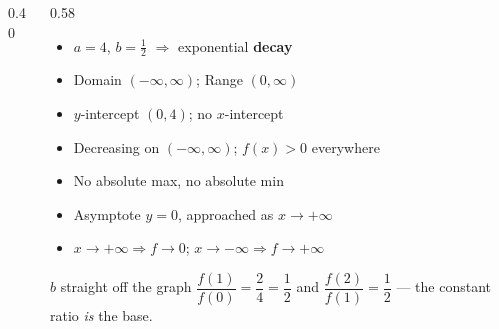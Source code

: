\documentclass[aspectratio=169, 11pt]{beamer}
\newcommand{\lgrid}[4]{%
  \draw[step=1, linegray!45, thin] (#1,#3) grid (#2,#4);
  \draw[->, thick, charcoal] (#1,0)--(#2,0) node[below right, font=\tiny]{$x$};
  \draw[->, thick, charcoal] (0,#3)--(0,#4) node[left, font=\tiny]{$y$};}
\newcommand{\expcurve}[4]{\draw[very thick, forest, domain=#3:#4, samples=120, smooth]
  plot (\x,{#1*exp((#2)*(\x))});}
\begin{document}
\begin{frame}[t, plain]
  \begin{columns}[T]
    \begin{column}{0.40\textwidth}
      \centering
    \end{column}
    \begin{column}{0.58\textwidth}
      \footnotesize
      \begin{itemize}\setlength{\itemsep}{3pt}
        \item $a=4$, $b=\frac12$ $\Rightarrow$ exponential \textbf{decay}
        \item Domain $(-\infty,\infty)$; \; Range $(0,\infty)$
        \item $y$-intercept $(0,4)$; \; no $x$-intercept
        \item Decreasing on $(-\infty,\infty)$; \; $f(x)>0$ everywhere
        \item No absolute max, no absolute min
        \item Asymptote $y=0$, approached as $x\to+\infty$
        \item $x\to+\infty \Rightarrow f\to0$; \quad $x\to-\infty \Rightarrow f\to+\infty$
      \end{itemize}
      \vspace{2pt}
      \begin{block}{$b$ straight off the graph}
        $\dfrac{f(1)}{f(0)}=\dfrac{2}{4}=\dfrac12$ \; and \; $\dfrac{f(2)}{f(1)}=\dfrac{1}{2}$ ---
        the constant ratio \emph{is} the base.
      \end{block}
    \end{column}
  \end{columns}
\end{frame}
\end{document}
